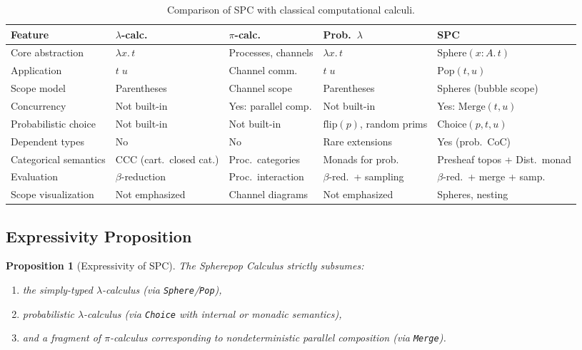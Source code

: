 \documentclass{article}
\newtheorem{proposition}[theorem]{Proposition}
\begin{document}
\usepackage{tabularx} %

\begin{table}[h]
\centering
\renewcommand{\arraystretch}{1.3}
\begin{tabularx}{\textwidth}{|l|X|X|X|X|}
\hline
\textbf{Feature} & $\lambda$-calc. & $\pi$-calc. & Prob.\ $\lambda$ & \textbf{SPC} \\
\hline
Core abstraction &
$\lambda x.\,t$ &
Processes, channels &
$\lambda x.\,t$ &
$\mathrm{Sphere}(x{:}A.\,t)$ \\
\hline
Application &
$t\;u$ &
Channel comm. &
$t\;u$ &
$\mathrm{Pop}(t,u)$ \\
\hline
Scope model &
Parentheses &
Channel scope &
Parentheses &
Spheres (bubble scope) \\
\hline
Concurrency &
Not built-in &
Yes: parallel comp. &
Not built-in &
Yes: $\mathrm{Merge}(t,u)$ \\
\hline
Probabilistic choice &
Not built-in &
Not built-in &
$\mathrm{flip}(p)$, random prims &
$\mathrm{Choice}(p,t,u)$ \\
\hline
Dependent types &
No &
No &
Rare extensions &
Yes (prob.\ CoC) \\
\hline
Categorical semantics &
CCC (cart.\ closed cat.) &
Proc.\ categories &
Monads for prob. &
Presheaf topos + Dist.\ monad \\
\hline
Evaluation &
$\beta$-reduction &
Proc.\ interaction &
$\beta$-red.\ + sampling &
$\beta$-red.\ + merge + samp. \\
\hline
Scope visualization &
Not emphasized &
Channel diagrams &
Not emphasized &
Spheres, nesting \\
\hline
\end{tabularx}
\caption{Comparison of SPC with classical computational calculi.}
\end{table}


\subsection{Expressivity Proposition}

\begin{proposition}[Expressivity of SPC]
The Spherepop Calculus strictly subsumes:
\begin{enumerate}
  \item the simply-typed $\lambda$-calculus (via \texttt{Sphere}/\texttt{Pop}),
  \item probabilistic $\lambda$-calculus (via \texttt{Choice} with internal or monadic semantics),
  \item and a fragment of $\pi$-calculus corresponding to nondeterministic parallel composition (via \texttt{Merge}).
\end{enumerate}
\end{proposition}
\end{document}
